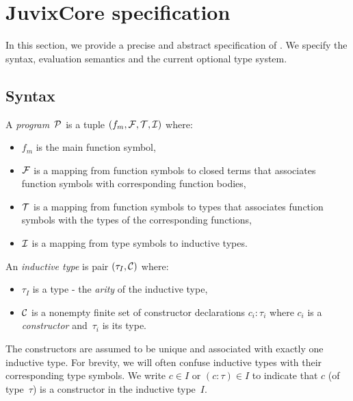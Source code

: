 \documentclass[final]{msc}
\begin{document}
\section{JuvixCore specification}\label{sec_specification}

In this section, we provide a precise and abstract specification of \JuvixCore{}. We specify the syntax, evaluation semantics and the current optional type system.

\subsection{Syntax}\label{sec_syntax}

A \JuvixCore{} \emph{program}~$\mathcal{P}$ is a tuple $(f_m,\mathcal{F},\mathcal{T},\mathcal{I})$ where:
\begin{itemize}
\item $f_m$ is the main function symbol,
\item $\mathcal{F}$ is a mapping from function symbols to closed terms that associates function symbols with corresponding function bodies,
\item $\mathcal{T}$ is a mapping from function symbols to types that associates function symbols with the types of the corresponding functions,
\item $\mathcal{I}$ is a mapping from type symbols to inductive types.
\end{itemize}
An \emph{inductive type} is pair $(\tau_I,\mathcal{C})$ where:
\begin{itemize}
\item $\tau_I$ is a type - the \emph{arity} of the inductive type,
\item $\mathcal{C}$ is a nonempty finite set of constructor declarations $c_i : \tau_i$ where $c_i$ is a \emph{constructor} and~$\tau_i$ is its type.
\end{itemize}
The constructors are assumed to be unique and associated with exactly one inductive type. For brevity, we will often confuse inductive types with their corresponding type symbols. We write $c \in I$ or $(c : \tau) \in I$ to indicate that $c$ (of type~$\tau$) is a constructor in the inductive type~$I$.
\end{document}
